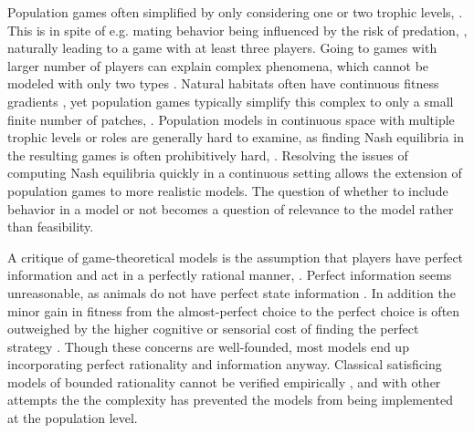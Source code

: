Population games often simplified by only considering  one or two trophic levels, \citep{cressman2004ideal,abrams2007role, sadowski2019predator}. This is in spite of e.g. mating behavior being influenced by the risk of predation, \citep{carranza1999red,lima2009predators}, naturally leading to a game with at least three players. Going to games with larger number of players can explain complex phenomena, which cannot be modeled with only two types \citep{pinti2019trophic}. Natural habitats often have continuous fitness gradients \citep{kawecki2004conceptual}, yet population games typically simplify this complex to only a small finite number of patches, \cite{valdovinos2010consequences}. Population models in continuous space with multiple trophic levels or roles are generally hard to examine, as finding Nash equilibria in the resulting games is often prohibitively hard, \citep{empirical_trait,pinti2019trophic}. Resolving the issues of computing Nash equilibria quickly in a continuous setting allows the extension of population games to more realistic models. The question of whether to include behavior in a model or not becomes a question of relevance to the model rather than feasibility.


A critique of game-theoretical models is the assumption that players have perfect information and act in a perfectly rational manner, \citep{jones1999bounded}. Perfect information seems unreasonable, as animals do not have perfect state information \citep{simon1955behavioral}. In addition the minor gain in fitness from the almost-perfect choice to the perfect choice is often outweighed by the higher cognitive or sensorial cost of finding the perfect strategy \citep{simon1956rational, cohen2019bounded}. Though these concerns are well-founded, most models end up incorporating perfect rationality and information anyway. Classical satisficing models of bounded rationality cannot be verified empirically \citep{nonacs1993satisficing}, and with other attempts the \citep{bayesianmodel, thuijsman1995automata} the complexity has prevented the models from being implemented at the population level.




